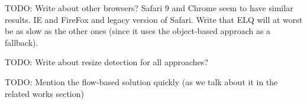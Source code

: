 \documentclass{acm_proc_article-sp}
\newcommand{\elq}{ELQ}
\begin{document}
    TODO: Write about other browsers? Safari 9 and Chrome seem to have similar results. IE and FireFox and legacy version of Safari. Write that \elq{} will at worst be as slow as the other ones (since it uses the object-based approach as a fallback).

    TODO: Write about resize detection for all approaches?

    TODO: Mention the flow-based solution quickly (as we talk about it in the related works section)


\end{document}
